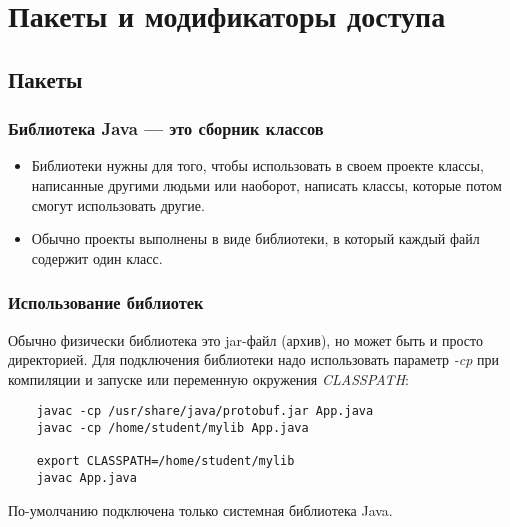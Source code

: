 \section{Пакеты и модификаторы доступа}
\subsection{Пакеты}

\begin{frame}[fragile]
	\frametitle{Библиотека Java — это сборник классов}

	\begin{Large}
	\begin{itemize}
	\item{Библиотеки нужны для того, чтобы использовать в своем проекте классы, написанные другими людьми или наоборот, написать классы, которые потом смогут использовать другие.}
	\item{Обычно проекты выполнены в виде библиотеки, в который каждый файл содержит один класс.}
	\end{itemize}
	\end{Large}
\end{frame}

\begin{frame}[fragile]
	\frametitle{Использование библиотек}

	\begin{large}
	Обычно физически библиотека это jar-файл (архив), но может быть и просто директорией. Для подключения библиотеки надо использовать параметр \emph{-cp} при компиляции и запуске или переменную окружения \emph{CLASSPATH}:
	\medskip

	\begin{verbatim}
	javac -cp /usr/share/java/protobuf.jar App.java
	javac -cp /home/student/mylib App.java
	
	export CLASSPATH=/home/student/mylib
	javac App.java
	\end{verbatim}
	\end{large}

	По-умолчанию подключена только системная библиотека Java.
\end{frame}

